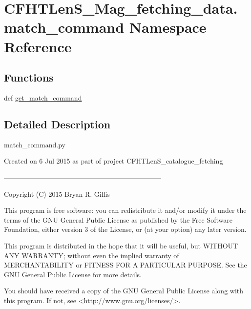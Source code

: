 \hypertarget{namespaceCFHTLenS__Mag__fetching__data_1_1match__command}{\section{C\-F\-H\-T\-Len\-S\-\_\-\-Mag\-\_\-fetching\-\_\-data.\-match\-\_\-command Namespace Reference}
\label{namespaceCFHTLenS__Mag__fetching__data_1_1match__command}
}
\subsection*{Functions}
\begin{DoxyCompactItemize}
\item 
def \hyperlink{namespaceCFHTLenS__Mag__fetching__data_1_1match__command_a73192edec1aec32b3511f743a2f9095e}{get\-\_\-match\-\_\-command}
\end{DoxyCompactItemize}


\subsection{Detailed Description}
\begin{DoxyVerb}match_command.py

Created on 6 Jul 2015 as part of project CFHTLenS_catalogue_fetching

---------------------------------------------------------------------

Copyright (C) 2015  Bryan R. Gillis

This program is free software: you can redistribute it and/or modify
 it under the terms of the GNU General Public License as published by
 the Free Software Foundation, either version 3 of the License, or
 (at your option) any later version.

 This program is distributed in the hope that it will be useful,
 but WITHOUT ANY WARRANTY; without even the implied warranty of
 MERCHANTABILITY or FITNESS FOR A PARTICULAR PURPOSE.  See the
 GNU General Public License for more details.

You should have received a copy of the GNU General Public License
along with this program.  If not, see <http://www.gnu.org/licenses/>.\end{DoxyVerb}
 

